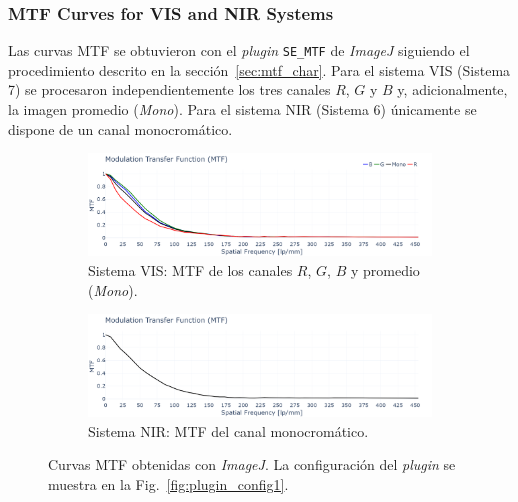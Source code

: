     \subsubsection{MTF Curves for VIS and NIR Systems}
    \label{subsub:mtf_curves}
    Las curvas MTF se obtuvieron con el \textit{plugin} \texttt{SE\_MTF} de \textit{ImageJ} siguiendo el procedimiento descrito en la sección~\ref{sec:mtf_char}.  
    Para el sistema VIS (Sistema 7) se procesaron independientemente los tres canales \(R\), \(G\) y \(B\) y, adicionalmente, la imagen promedio (\textit{Mono}).  
    Para el sistema NIR (Sistema 6) únicamente se dispone de un canal monocromático.

    \begin{figure}[H]
        \centering
        \begin{subfigure}[b]{0.48\linewidth}
            \centering
            \includegraphics[width=\linewidth]{Figures/C4/mtf_vis.png}
            \caption{Sistema VIS: MTF de los canales \(R\), \(G\), \(B\) y promedio (\textit{Mono}).}
            \label{fig:mtf_vis}
        \end{subfigure}
        \hfill
        \begin{subfigure}[b]{0.48\linewidth}
            \centering
            \includegraphics[width=\linewidth]{Figures/C4/mtf_nir.png}
            \caption{Sistema NIR: MTF del canal monocromático.}
            \label{fig:mtf_nir}
        \end{subfigure}
        \caption{Curvas MTF obtenidas con \textit{ImageJ}.  
                La configuración del \textit{plugin} se muestra en la Fig.~\ref{fig:plugin_config1}.}
        \label{fig:mtf_curves}
    \end{figure}

